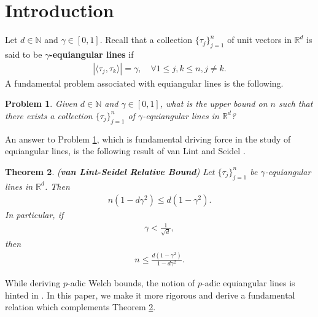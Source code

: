 \documentclass{amsart}
\newtheorem{theorem}{Theorem}[section]
\newtheorem{problem}[theorem]{Problem}
\begin{document}
\section{Introduction}
Let $d \in \mathbb{N}$ and $\gamma \in  [0,1]$. Recall that a collection $\{\tau_j\}_{j=1}^n$  of unit vectors  in $\mathbb{R}^d$	is said to be \textbf{$\gamma$-equiangular  lines} \cite{HAANTJES, LEMMENSSEIDEL} if 
	\begin{align*}
			|\langle \tau_j, \tau_k\rangle|=\gamma, \quad \forall 1\leq j, k \leq n, j \neq k.
	\end{align*}	
A fundamental problem associated with equiangular lines is  the following.
\begin{problem}\label{1} 
	Given $d \in \mathbb{N}$ and $\gamma \in  [0,1]$, what is the upper bound on $n$ such that there exists a collection $\{\tau_j\}_{j=1}^n$  of  $\gamma$-equiangular lines in $\mathbb{R}^d$?
	\end{problem}
An answer to Problem \ref{1}, which is   fundamental driving force in the study of equiangular lines, is the following result of van Lint and Seidel \cite{VANLINTSEIDEL, LEMMENSSEIDEL}.
\begin{theorem} \cite{VANLINTSEIDEL, LEMMENSSEIDEL} (\textbf{van Lint-Seidel Relative Bound}) \label{VSTHEOREM}
Let $\{\tau_j\}_{j=1}^n$  	be  $\gamma$-equiangular  lines in $\mathbb{R}^d$. 
Then 
\begin{align*}
n(1-d\gamma^2) \leq d(1-\gamma^2).
\end{align*}
In particular, if 
\begin{align*}
	\gamma <\frac{1}{\sqrt{d}},
\end{align*}
then 
\begin{align*}
	n\leq \frac{d(1-\gamma^2)}{1-d\gamma^2}.
\end{align*}
\end{theorem}
 While deriving $p$-adic Welch bounds, the notion of $p$-adic equiangular lines is hinted in \cite{MAHESHKRISHNA}. In this paper, we make  it more rigorous and derive a fundamental relation which complements Theorem \ref{VSTHEOREM}.
\end{document}

